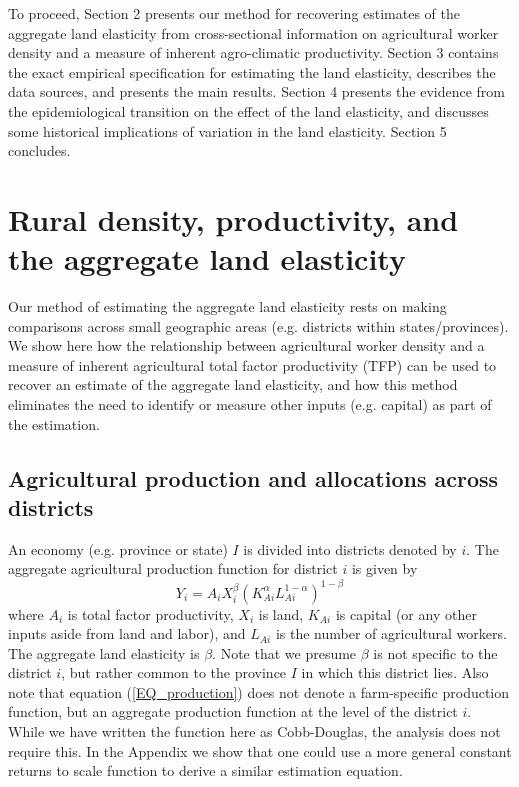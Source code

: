 \documentclass[11pt]{article}
\begin{document}
To proceed, Section 2 presents our method for recovering estimates of the aggregate land elasticity from cross-sectional information on agricultural worker density and a measure of inherent agro-climatic productivity. Section 3 contains the exact empirical specification for estimating the land elasticity, describes the data sources, and presents the main results. Section 4 presents the evidence from the epidemiological transition on the effect of the land elasticity, and discusses some historical implications of variation in the land elasticity. Section 5 concludes.

\section{Rural density, productivity, and the aggregate land elasticity}\label{SEC_agmodel}
Our method of estimating the aggregate land elasticity rests on making comparisons across small geographic areas (e.g. districts within states/provinces). We show here how the relationship between agricultural worker density and a measure of inherent agricultural total factor productivity (TFP) can be used to recover an estimate of the aggregate land elasticity, and how this method eliminates the need to identify or measure other inputs (e.g. capital) as part of the estimation.

\subsection{Agricultural production and allocations across districts}
An economy (e.g. province or state) $I$ is divided into districts denoted by $i$. The aggregate agricultural production function for district $i$ is given by 
\begin{equation}
Y_{i} = A_{i} X_{i}^{\beta} \left(K_{Ai}^{\alpha}L_{Ai}^{1-\alpha}\right)^{1-\beta} \label{EQ_production}
\end{equation}
where $A_{i}$ is total factor productivity, $X_{i}$ is land, $K_{Ai}$ is capital (or any other inputs aside from land and labor), and $L_{Ai}$ is the number of agricultural workers. The aggregate land elasticity is $\beta$. Note that we presume $\beta$ is not specific to the district $i$, but rather common to the province $I$ in which this district lies. Also note that equation (\ref{EQ_production}) does not denote a farm-specific production function, but an aggregate production function at the level of the district $i$. While we have written the function here as Cobb-Douglas, the analysis does not require this. In the Appendix we show that one could use a more general constant returns to scale function to derive a similar estimation equation.
\end{document}
